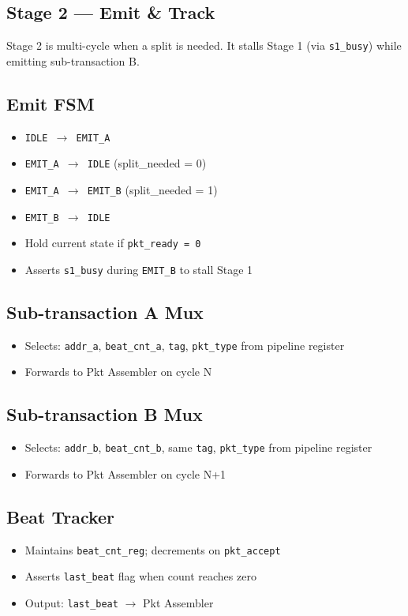 \subsection{Stage 2 --- Emit \& Track}

Stage 2 is multi-cycle when a split is needed. It stalls Stage 1 (via \texttt{s1\_busy}) while emitting sub-transaction B.

\subsection{Emit FSM}

\begin{itemize}[noitemsep]
  \item \texttt{IDLE $\rightarrow$ EMIT\_A}
  \item \texttt{EMIT\_A $\rightarrow$ IDLE} \hfill (split\_needed = 0)
  \item \texttt{EMIT\_A $\rightarrow$ EMIT\_B} \hfill (split\_needed = 1)
  \item \texttt{EMIT\_B $\rightarrow$ IDLE}
  \item Hold current state if \texttt{pkt\_ready = 0}
  \item Asserts \texttt{s1\_busy} during \texttt{EMIT\_B} to stall Stage 1
\end{itemize}

\subsection{Sub-transaction A Mux}
\begin{itemize}[noitemsep]
  \item Selects: \texttt{addr\_a}, \texttt{beat\_cnt\_a}, \texttt{tag}, \texttt{pkt\_type} from pipeline register
  \item Forwards to Pkt Assembler on cycle N
\end{itemize}

\subsection{Sub-transaction B Mux}
\begin{itemize}[noitemsep]
  \item Selects: \texttt{addr\_b}, \texttt{beat\_cnt\_b}, same \texttt{tag}, \texttt{pkt\_type} from pipeline register
  \item Forwards to Pkt Assembler on cycle N+1
\end{itemize}

\subsection{Beat Tracker}
\begin{itemize}[noitemsep]
  \item Maintains \texttt{beat\_cnt\_reg}; decrements on \texttt{pkt\_accept}
  \item Asserts \texttt{last\_beat} flag when count reaches zero
  \item Output: \texttt{last\_beat} $\rightarrow$ Pkt Assembler
\end{itemize}

